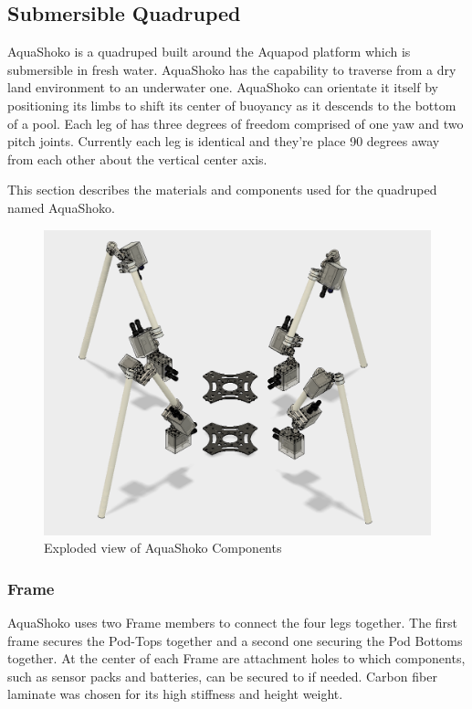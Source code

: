 \subsection{Submersible Quadruped}
AquaShoko is a quadruped built around the Aquapod platform which is submersible in fresh water. AquaShoko has the capability to traverse from a dry land environment to an underwater one. AquaShoko can orientate it itself by positioning its limbs to shift its center of buoyancy as it descends to the bottom of a pool. Each leg of has three degrees of freedom comprised of one yaw and two pitch joints. Currently each leg is identical and they’re place 90 degrees away from each other about the vertical center axis. 


This section describes the materials and components used for the quadruped named AquaShoko.


\begin{figure}[h]
\centering
\includegraphics[width=1.0\columnwidth]{./img/aquaShoko-v3dot3-exploded-assembly.png}
\caption{Exploded view of AquaShoko Components}
\label{fig:shoko exploded}
\end{figure}


\subsubsection{Frame}
AquaShoko uses two Frame members to connect the four legs together. The first frame secures the Pod-Tops together and a second one securing the Pod Bottoms together. At the center of each Frame are attachment holes to which components, such as sensor packs and batteries, can be secured to if needed. Carbon fiber laminate was chosen for its high stiffness and height weight.

